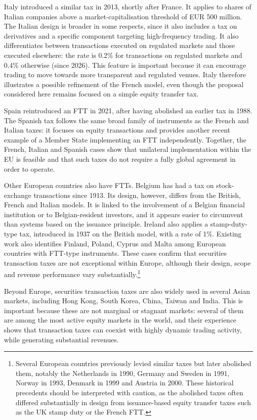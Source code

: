 \documentclass[../../main]{subfiles}
\begin{document}
Italy introduced a similar tax in 2013, shortly after France. It applies to shares of Italian companies above a market-capitalisation threshold of EUR 500 million. The Italian design is broader in some respects, since it also includes a tax on derivatives and a specific component targeting high-frequency trading. It also differentiates between transactions executed on regulated markets and those executed elsewhere: the rate is 0.2\% for transactions on regulated markets and 0.4\% otherwise (since 2026). This feature is important because it can encourage trading to move towards more transparent and regulated venues. Italy therefore illustrates a possible refinement of the French model, even though the proposal considered here remains focused on a simple equity transfer tax.

Spain reintroduced an FTT in 2021, after having abolished an earlier tax in 1988. The Spanish tax follows the same broad family of instruments as the French and Italian taxes: it focuses on equity transactions and provides another recent example of a Member State implementing an FTT independently. Together, the French, Italian and Spanish cases show that unilateral implementation within the EU is feasible and that such taxes do not require a fully global agreement in order to operate.

Other European countries also have FTTs. Belgium has had a tax on stock-exchange transactions since 1913. Its design, however, differs from the British, French and Italian models. It is linked to the involvement of a Belgian financial institution or to Belgian-resident investors, and it appears easier to circumvent than systems based on the issuance principle. Ireland also applies a stamp-duty-type tax, introduced in 1937 on the British model, with a rate of 1\%. Existing work also identifies Finland, Poland, Cyprus and Malta among European countries with FTT-type instruments. These cases confirm that securities transaction taxes are not exceptional within Europe, although their design, scope and revenue performance vary substantially.\footnote{Several European countries previously levied similar taxes but later abolished them, notably the Netherlands in 1990, Germany and Sweden in 1991, Norway in 1993, Denmark in 1999 and Austria in 2000. These historical precedents should be interpreted with caution, as the abolished taxes often differed substantially in design from issuance-based equity transfer taxes such as the UK stamp duty or the French FTT.}

Beyond Europe, securities transaction taxes are also widely used in several Asian markets, including Hong Kong, South Korea, China, Taiwan and India. This is important because these are not marginal or stagnant markets: several of them are among the most active equity markets in the world, and their experience shows that transaction taxes can coexist with highly dynamic trading activity, while generating substantial revenues.
\end{document}
